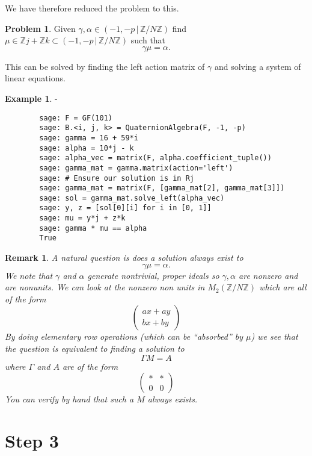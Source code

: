 \documentclass[10pt]{article}
\theoremstyle{plain}
\newtheorem{remark}[theorem]{Remark}
\theoremstyle{definition}
\newtheorem{example}[theorem]{Example}
\newtheorem{problem}[theorem]{Problem}
\newcommand{\Z}{\mathbb{Z}}
\begin{document}
We have therefore reduced the problem to this.

\begin{problem}
Given \( \gamma, \alpha \in (-1, -p \, | \, \Z / N\Z) \) find \( \mu \in \Z j + \Z k \subset (-1, -p \, | \, \Z / N\Z) \) such that
\[
    \gamma \mu = \alpha .
\]
\end{problem}

This can be solved by finding the left action matrix of \( \gamma \) and solving a system of linear equations.

\begin{example}
    -
    \begin{lstlisting}
        sage: F = GF(101)
        sage: B.<i, j, k> = QuaternionAlgebra(F, -1, -p)
        sage: gamma = 16 + 59*i
        sage: alpha = 10*j - k
        sage: alpha_vec = matrix(F, alpha.coefficient_tuple())
        sage: gamma_mat = gamma.matrix(action='left')
        sage: # Ensure our solution is in Rj
        sage: gamma_mat = matrix(F, [gamma_mat[2], gamma_mat[3]])
        sage: sol = gamma_mat.solve_left(alpha_vec)
        sage: y, z = [sol[0][i] for i in [0, 1]]
        sage: mu = y*j + z*k
        sage: gamma * mu == alpha
        True
    \end{lstlisting}
\end{example}

\begin{remark}
    A natural question is does a solution always exist to
    \[
        \gamma \mu = \alpha .
    \]
    We note that \( \gamma \) and \( \alpha \) generate nontrivial, proper ideals so \( \gamma, \alpha \) are nonzero and are nonunits.
    We can look at the nonzero non units in \( M_2(\Z / N\Z) \) which are all of the form
    \[
        \begin{pmatrix}
            ax + ay \\
            bx + by
        \end{pmatrix}
    \]
    By doing elementary row operations (which can be ``absorbed'' by \( \mu \)) we see that the question is equivalent to finding a solution to
    \[
        \Gamma M = A
    \]
    where \( \Gamma \) and \( A \) are of the form
    \[
        \begin{pmatrix}
            * & * \\
            0 & 0
        \end{pmatrix}
    \]
    You can verify by hand that such a \( M \) always exists.
\end{remark}


\section{Step 3}
\end{document}
